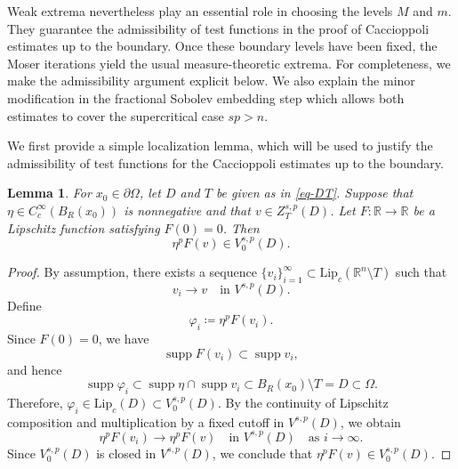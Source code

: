 \documentclass[11pt]{amsart}
\theoremstyle{plain}
\newtheorem{lemma}[theorem]{Lemma}
\theoremstyle{definition}
\numberwithin{equation}{section}
\DeclareMathOperator*{\supp}{supp}
\begin{document}
Weak extrema nevertheless play an essential role in choosing the levels $M$ and $m$. They guarantee the admissibility of test functions in the proof of Caccioppoli estimates up to the boundary. Once these boundary levels have been fixed, the Moser iterations yield the usual measure-theoretic extrema. For completeness, we make the admissibility argument explicit below. We also explain the minor modification in the fractional Sobolev embedding step which allows both estimates to cover the supercritical case $sp > n$.




We first provide a simple localization lemma, which will be used to justify the admissibility of test functions for the Caccioppoli estimates up to the boundary.

\begin{lemma}\label{lem-test-fts}
For $x_0 \in \partial \Omega$, let $D$ and $T$ be given as in \eqref{eq-DT}. Suppose that $\eta\in C_c^\infty(B_R(x_0))$ is nonnegative and that $v \in Z^{s, p}_T(D)$. Let $F: \mathbb{R} \to \mathbb{R}$ be a Lipschitz function satisfying $F(0)=0$. Then
\begin{equation*}
\eta^p F(v) \in V^{s, p}_0(D).
\end{equation*}
\end{lemma}

\begin{proof}
By assumption, there exists a sequence $\{v_i\}_{i=1}^{\infty} \subset \mathrm{Lip}_c(\mathbb{R}^n \setminus T)$ such that
\begin{equation*}
v_i \to v \quad\text{in }V^{s, p}(D).
\end{equation*}
Define
\begin{equation*}
\varphi_i \coloneqq \eta^p F(v_i).
\end{equation*}
Since $F(0)=0$, we have
\begin{equation*}
\supp{F(v_i)} \subset \supp{v_i},
\end{equation*}
and hence
\begin{equation*}
\supp{\varphi_i} \subset \supp{\eta} \cap \supp{v_i} \subset B_R(x_0) \setminus T = D \subset \Omega.
\end{equation*}
Therefore, $\varphi_i \in \mathrm{Lip}_c(D) \subset V^{s, p}_0(D)$. By the continuity of Lipschitz composition and multiplication by a fixed cutoff in $V^{s, p}(D)$, we obtain
\begin{equation*}
\eta^p F(v_i) \to \eta^p F(v) \quad\text{in }V^{s, p}(D) \quad\text{as }i \to \infty.
\end{equation*}
Since $V^{s, p}_0(D)$ is closed in $V^{s, p}(D)$, we conclude that $\eta^p F(v) \in V^{s, p}_0(D)$.
\end{proof}
\end{document}
